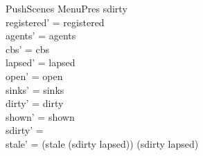 \documentclass[a4paper,10pt,fleqn]{article}
\begin{document}
\begin{schema}{PushScenes}
  \Delta MenuPres
\where
  sdirty \neq \emptyset \\
  registered' = registered \\
  agents' = agents \\
  cbs' = cbs \\
  lapsed' = lapsed \\
  open' = open \\
  sinks' = sinks \\
  dirty' = dirty \\
  shown' = shown \\
  sdirty' = \emptyset \\
  stale' = (stale \setminus (sdirty \setminus lapsed)) \cup (sdirty \cap lapsed)
\end{schema}
\end{document}
